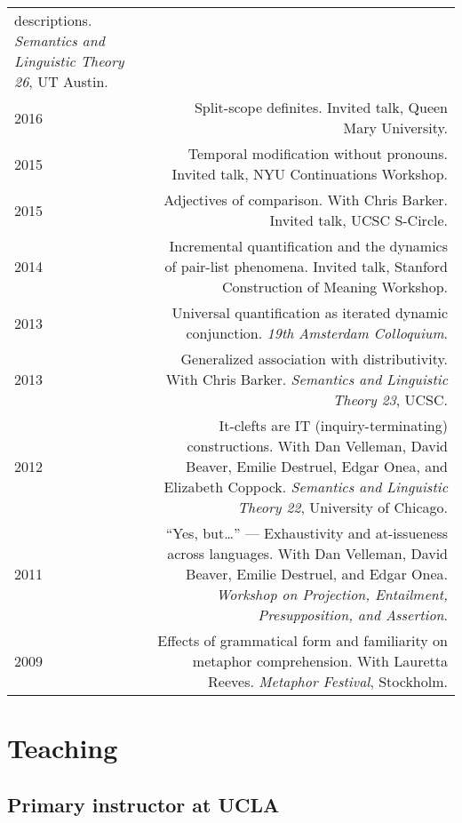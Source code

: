 \documentclass[12pt]{article}
\begin{document}
\begin{longtable}{LR}
         descriptions.
         \textit{Semantics and Linguistic Theory 26}, UT Austin.\\
  2016 & Split-scope definites.
         Invited talk, Queen Mary University.\\
  2015 & Temporal modification without pronouns.
         Invited talk, NYU Continuations Workshop.\\
  2015 & Adjectives of comparison.
         With Chris Barker.
         Invited talk, UCSC S-Circle.\\
  2014 & Incremental quantification and the dynamics of pair-list phenomena.
         Invited talk, Stanford Construction of Meaning Workshop.\\
  2013 & Universal quantification as iterated dynamic conjunction.
         \textit{19th Amsterdam Colloquium}. \\
  2013 & Generalized association with distributivity.
         With Chris Barker.
         \textit{Semantics and Linguistic Theory 23}, UCSC.\\
  2012 & It-clefts are IT (inquiry-terminating) constructions.
         With Dan Velleman, David Beaver, Emilie Destruel, Edgar Onea, and
         Elizabeth Coppock.
         \textit{Semantics and Linguistic Theory 22}, University of Chicago.\\
  2011 & ``Yes, but\dots'' --- Exhaustivity and at-issueness across languages.
          With Dan Velleman, David Beaver, Emilie Destruel, and Edgar Onea.
          \textit{Workshop on Projection, Entailment, Presupposition, and
          Assertion}.\\
  2009 & Effects of grammatical form and familiarity on metaphor
         comprehension.
         With Lauretta Reeves.
         \textit{Metaphor Festival}, Stockholm.
\end{longtable}

\medskip

\section*{Teaching}

\subsection*{Primary instructor at UCLA}
\end{document}

